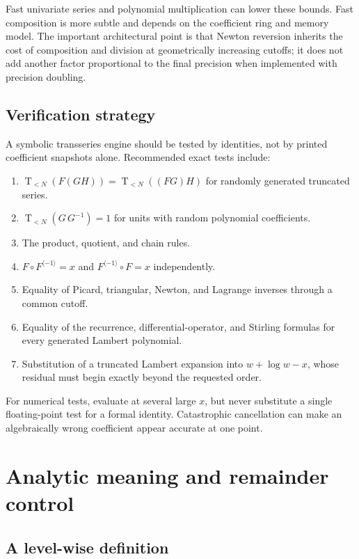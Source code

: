 \documentclass[11pt,oneside]{article}
\numberwithin{equation}{section}
\theoremstyle{definition}
\newcommand{\rev}{\langle -1\rangle}
\newcommand{\trunc}[2]{\mathop{\mathrm{T}}_{<#1}\!\left(#2\right)}
\begin{document}
Fast univariate series and polynomial multiplication can lower these bounds.
Fast composition is more subtle and depends on the coefficient ring and memory
model.  The important architectural point is that Newton reversion inherits the
cost of composition and division at geometrically increasing cutoffs; it does
not add another factor proportional to the final precision when implemented
with precision doubling.

\subsection{Verification strategy}

A symbolic transseries engine should be tested by identities, not by printed
coefficient snapshots alone.  Recommended exact tests include:
\begin{enumerate}
\item \(\trunc{N}{F(GH)}=\trunc{N}{(FG)H}\) for randomly generated truncated
  series.
\item \(\trunc{N}{G\,G^{-1}}=1\) for units with random polynomial coefficients.
\item The product, quotient, and chain rules.
\item \(F\circ F^{\rev}=x\) and \(F^{\rev}\circ F=x\) independently.
\item Equality of Picard, triangular, Newton, and Lagrange inverses through a
  common cutoff.
\item Equality of the recurrence, differential-operator, and Stirling formulas
  for every generated Lambert polynomial.
\item Substitution of a truncated Lambert expansion into
  \(w+\log w-x\), whose residual must begin exactly beyond the requested order.
\end{enumerate}

For numerical tests, evaluate at several large \(x\), but never substitute a
single floating-point test for a formal identity.  Catastrophic cancellation can
make an algebraically wrong coefficient appear accurate at one point.

\section{Analytic meaning and remainder control}\label{sec:analytic-meaning}

\subsection{A level-wise definition}
\end{document}
